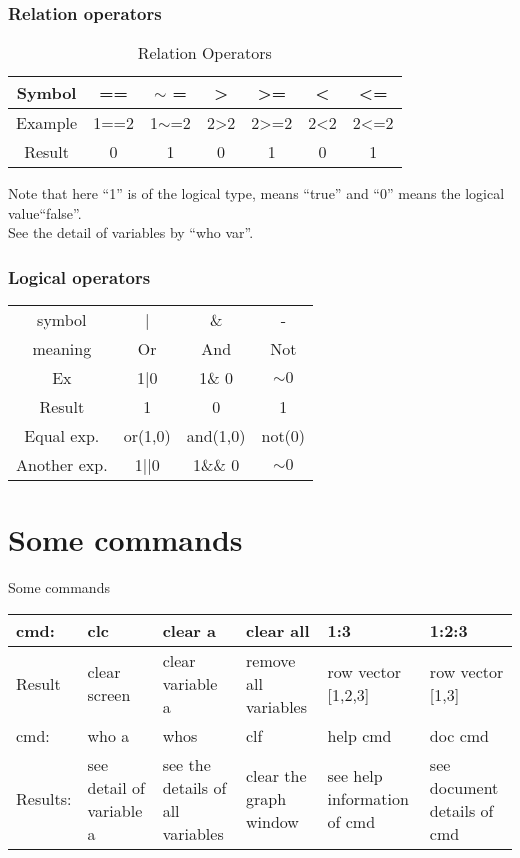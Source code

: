 \documentclass[aspectratio=169]{beamer}
\begin{document}
\begin{frame}
  \frametitle{Relation operators}
   \begin{table}
  \small
   \begin{tabular}{ccccccc}\toprule
    Symbol & ==&$\sim$ =&>& >=&<&<=\\\midrule
     Example&1==2&1$\sim$=2&2>2&2>=2& 2<2 &2<=2\\\midrule
     Result&0&1&0&1&0&1\\\bottomrule
   \end{tabular}
   \caption{Relation Operators}
 \end{table}
 Note that here ``1'' is of the logical type, means ``true'' and ``0'' means the logical value``false''.\\
 See the detail of variables by ``{\color{blue}who var}''.
\end{frame}
\begin{frame}
  \frametitle{Logical operators}
  \begin{table}
    \centering
    \begin{tabular}{cccc}\toprule
      symbol & |&\& &-\\
      meaning & Or & And& Not\\
      Ex& 1|0& 1\& 0 &$\sim 0$ \\
      Result& 1& 0& 1\\
      Equal exp.& or(1,0)&and(1,0)&not(0)\\
      Another exp.& 1||0& 1\&\& 0& $\sim 0$\\\bottomrule
    \end{tabular}
  \end{table}
\end{frame}
\section{Some commands}
\begin{frame}{Some commands}
  \begin{table}
    \centering
    \tiny
    \begin{tabularx}{\linewidth}{lXXXXX}\toprule
      cmd: & clc & clear a & clear all & 1:3&1:2:3\\\midrule
      Result& clear screen & clear variable a& remove all variables & row vector [1,2,3]& row vector [1,3]\\\midrule
      cmd:& who a & whos &clf&help cmd& doc cmd\\\midrule
      Results: &see detail of variable a& see the details of all variables& clear the graph window& see help information
      of cmd& see document details of cmd\\\bottomrule
    \end{tabularx}
  \end{table}
\end{frame}
\end{document}
